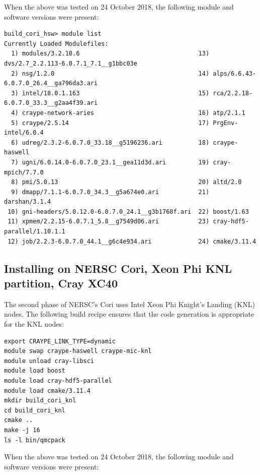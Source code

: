 When the above was tested on 24 October 2018, the following module and
software versions were present:

\verbatimfont{\footnotesize}
\begin{verbatim}
build_cori_hsw> module list
Currently Loaded Modulefiles:
  1) modules/3.2.10.6                                 13) dvs/2.7_2.2.113-6.0.7.1_7.1__g1bbc03e
  2) nsg/1.2.0                                        14) alps/6.6.43-6.0.7.0_26.4__ga796da3.ari
  3) intel/18.0.1.163                                 15) rca/2.2.18-6.0.7.0_33.3__g2aa4f39.ari
  4) craype-network-aries                             16) atp/2.1.1
  5) craype/2.5.14                                    17) PrgEnv-intel/6.0.4
  6) udreg/2.3.2-6.0.7.0_33.18__g5196236.ari          18) craype-haswell
  7) ugni/6.0.14.0-6.0.7.0_23.1__gea11d3d.ari         19) cray-mpich/7.7.0
  8) pmi/5.0.13                                       20) altd/2.0
  9) dmapp/7.1.1-6.0.7.0_34.3__g5a674e0.ari           21) darshan/3.1.4
 10) gni-headers/5.0.12.0-6.0.7.0_24.1__g3b1768f.ari  22) boost/1.63
 11) xpmem/2.2.15-6.0.7.1_5.8__g7549d06.ari           23) cray-hdf5-parallel/1.10.1.1
 12) job/2.2.3-6.0.7.0_44.1__g6c4e934.ari             24) cmake/3.11.4
\end{verbatim}

\subsection{Installing on NERSC Cori, Xeon Phi KNL partition, Cray XC40}
The second phase of NERSC's Cori uses Intel
Xeon Phi Knight's Landing (KNL) nodes. The following build recipe ensures that the code
generation is appropriate for the KNL nodes:

\verbatimfont{\footnotesize}
\begin{verbatim}
export CRAYPE_LINK_TYPE=dynamic
module swap craype-haswell craype-mic-knl
module unload cray-libsci
module load boost
module load cray-hdf5-parallel
module load cmake/3.11.4
mkdir build_cori_knl
cd build_cori_knl
cmake ..
make -j 16
ls -l bin/qmcpack
\end{verbatim}

When the above was tested on 24 October 2018, the following module and
software versions were present:

